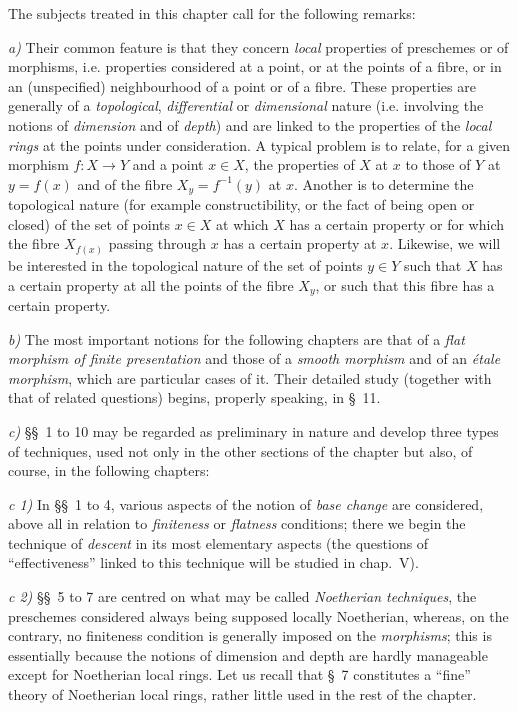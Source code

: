 \clearpage
{}

The subjects treated in this chapter call for the following remarks:

\medskip
\noindent
\emph{a)} Their common feature is that they concern \emph{local} properties
of preschemes or of morphisms, i.e. properties considered at a point, or at
the points of a fibre, or in an (unspecified) neighbourhood of a point or of
a fibre. These properties are generally of a \emph{topological},
\emph{differential} or \emph{dimensional} nature (i.e. involving the
notions of \emph{dimension} and of \emph{depth}) and are linked to the
properties of the \emph{local rings} at the points under consideration. A
typical problem is to relate, for a given morphism $f:X\to Y$ and a point
$x\in X$, the properties of $X$ at $x$ to those of $Y$ at $y=f(x)$ and of
the fibre $X_y=f^{-1}(y)$ at $x$. Another is to determine the topological
nature (for example constructibility, or the fact of being open or
closed) of the set of points $x\in X$ at which $X$ has a certain
property or for which the fibre $X_{f(x)}$ passing through $x$ has a
certain property at $x$. Likewise, we will be interested in the topological
nature of the set of points $y\in Y$ such that $X$ has a certain property at
all the points of the fibre $X_y$, or such that this fibre has a certain
property.

\medskip
\noindent
\emph{b)} The most important notions for the following chapters are
that of a \emph{flat morphism of finite presentation} and those of a
\emph{smooth morphism} and of an \emph{étale morphism}, which are particular
cases of it. Their detailed study (together with that of related questions)
begins, properly speaking, in §~11.

\medskip
\noindent
\emph{c)} §§~1 to 10 may be regarded as preliminary in nature
and develop three types of techniques, used not only in the
other sections of the chapter but also, of course, in the following
chapters:

\medskip
\noindent
\emph{c 1)} In §§~1 to 4, various aspects of the notion of
\emph{base change} are considered, above all in relation to
\emph{finiteness} or \emph{flatness} conditions; there we begin the
technique of \emph{descent} in its most elementary aspects (the questions
of ``effectiveness'' linked to this technique will be studied in chap.~V).

\medskip
\noindent
\emph{c 2)} §§~5 to 7 are centred on what may be called
\emph{Noetherian techniques}, the preschemes considered always being
supposed locally Noetherian, whereas, on the contrary, no finiteness
condition is generally imposed on the \emph{morphisms}; this is
essentially because the notions of dimension and depth are hardly
manageable except for Noetherian local rings. Let us recall that §~7
constitutes a ``fine'' theory of Noetherian local rings, rather little
used in the rest of the chapter.

